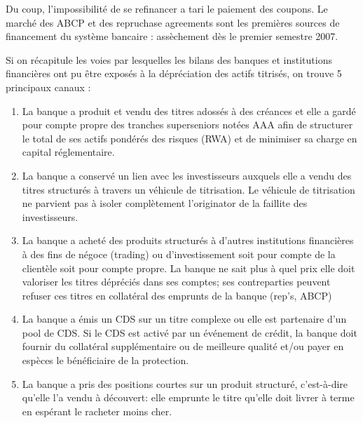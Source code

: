 	Du coup, l'impossibilité de se refinancer a tari le paiement des coupons. Le marché des ABCP et des repruchase agreements sont les premières sources de financement du système bancaire : assèchement dès le premier semestre 2007.
	
	
	Si on récapitule les voies par lesquelles les bilans des banques et institutions financières ont pu être exposés à la dépréciation des actifs titrisés, on trouve 5 principaux canaux :

	\begin{enumerate}
		\item La banque a produit et vendu des titres adossés à des créances et elle a gardé pour compte propre des tranches superseniors notées AAA afin de structurer le total de ses actifs pondérés des risques (RWA) et de minimiser sa charge en capital réglementaire.
		\item La banque a conservé un lien avec les investisseurs auxquels elle a vendu des titres structurés à travers un véhicule de titrisation. Le véhicule de titrisation ne parvient pas à isoler complètement l'originator de la faillite des investisseurs. 
		\item La banque a acheté des produits structurés à d’autres institutions 
financières à des fins de négoce (trading) ou d’investissement soit pour compte de la clientèle soit pour compte propre. La banque ne sait plus à quel prix elle doit valoriser les titres dépréciés dans ses comptes; ses contreparties peuvent refuser ces titres en collatéral des emprunts de la banque (rep's, ABCP) 
		\item La banque a émis un CDS sur un titre complexe ou elle est partenaire d'un pool de CDS. Si le CDS est activé par un événement de crédit, la banque doit fournir du collatéral supplémentaire ou de meilleure qualité et/ou payer en espèces le bénéficiaire de la protection. 
		\item La banque a pris des positions courtes sur un produit structuré, c'est-à-dire qu'elle l'a vendu à découvert: elle emprunte le titre qu'elle doit livrer à terme en espérant le racheter moins cher.
	\end{enumerate}
